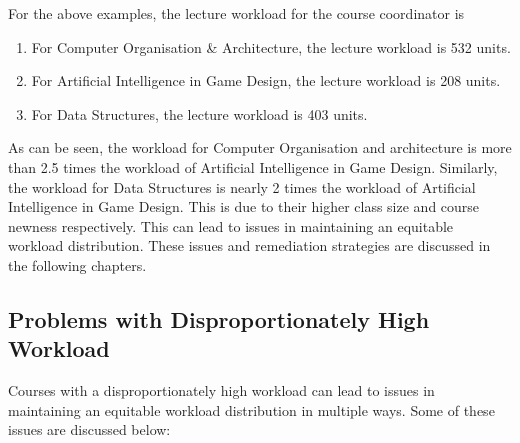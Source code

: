 For the above examples, the lecture workload for the course coordinator is

\begin{enumerate}
  \item For Computer Organisation \& Architecture, the lecture workload is 532 units.
  \item For Artificial Intelligence in Game Design, the lecture workload is 208 units.
  \item For Data Structures, the lecture workload is 403 units.
\end{enumerate}

As can be seen, the workload for Computer Organisation and architecture is more than 2.5 times the workload of Artificial Intelligence in Game Design. Similarly, the workload for Data Structures is nearly 2 times the workload of Artificial Intelligence in Game Design. This is due to their higher class size and course newness respectively. This can lead to issues in maintaining an equitable workload distribution. These issues and remediation strategies are discussed in the following chapters.

\subsection{Problems with Disproportionately High Workload}

Courses with a disproportionately high workload can lead to issues in maintaining an equitable workload distribution in multiple ways. Some of these issues are discussed below:

